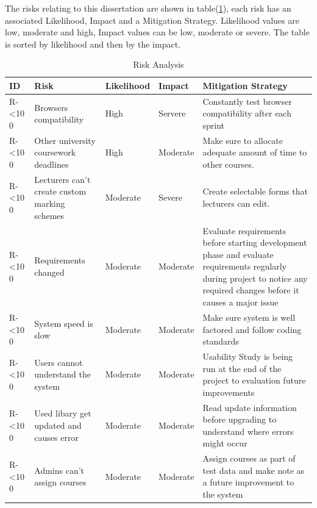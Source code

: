 \documentclass[12pt]{article}  %
\newcommand{\rid}[1]{\centering #1-\ifnum\value{requirement}<10 0\fi\arabic{requirement} \stepcounter{requirement}}
\begin{document}
The risks relating to this dissertation are shown in table(\ref{table:risks}), each risk has an associated Likelihood, Impact and a Mitigation Strategy. Likelihood values are low, moderate and high, Impact values can be low, moderate or severe. The table is sorted by likelihood and then by the impact.

\begin{spacing}{1.5}
\begin{longtable}{|p{}|p{}|p{}|p{}|p{}|} 
\caption{Risk Analysis} \label{table:risks} \\
\hline

\textbf{ID} & \textbf{Risk} & \textbf{Likelihood} & \textbf{Impact } & \textbf{Mitigation Strategy}\\
\hline

\rid{R} & Browsers compatibility & High & Servere & Constantly test browser compatibility after each sprint\\ \hline

\rid{R} & Other university coursework deadlines & High & Moderate & Make sure to allocate adequate amount of time to other courses.\\ \hline



\rid{R} & Lecturers can’t create custom marking schemes & Moderate & Severe & Create selectable forms that lecturers can edit.\\ \hline

\rid{R} & Requirements changed & Moderate & Moderate & Evaluate requirements before starting development phase and evaluate requirements regularly during project to notice any required changes before it causes a major issue \\ \hline

\rid{R} & System speed is slow & Moderate & Moderate & Make sure system is well factored and follow coding standards \\ \hline

\rid{R} & Users cannot understand the system & Moderate & Moderate & Usability Study is being run at the end of the project to evaluation future improvements\\ \hline

\rid{R} & Used libary get updated and causes error & Moderate & Moderate & Read update information before upgrading to understand where errors might occur\\ \hline

\rid{R} & Admins can’t assign courses & Moderate & Moderate & Assign courses as part of test data and make note as a future improvement to the system  \\ \hline


\end{longtable}
\end{spacing}
\end{document}
